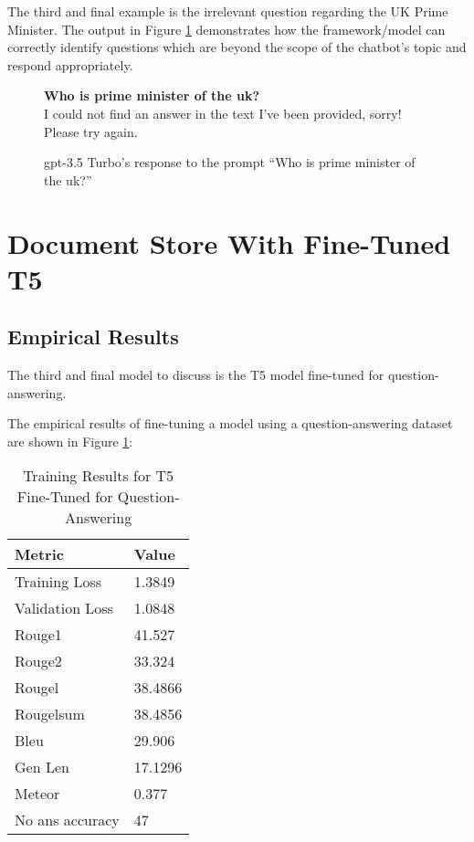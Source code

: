The third and final example is the irrelevant question regarding the UK Prime Minister. The output in Figure \ref{fig:results_gpt_ex3} demonstrates how the framework/model can correctly identify questions which are beyond the scope of the chatbot's topic and respond appropriately.

\begin{figure}[h]
    \begin{itquote}
        \textbf{Who is prime minister of the uk?} \\
        I could not find an answer in the text I've been provided, sorry! Please try again.
    \end{itquote}
    \caption{\acrshort{gpt}-3.5 Turbo's response to the prompt ``Who is prime minister of the uk?''}
    \label{fig:results_gpt_ex3}
\end{figure}

\section{Document Store With Fine-Tuned T5}\label{sec:results_t5}
\subsection{Empirical Results}
The third and final model to discuss is the T5 model fine-tuned for question-answering.



The empirical results of fine-tuning a model using a question-answering dataset are shown in Figure \ref{tab:results_t5}:

\begin{table}[h]
    \centering
    \begin{tabular}{l|l}
        \textbf{Metric} & \textbf{Value} \\ \hline
        Training Loss & 1.3849 \\ \hline
        Validation Loss & 1.0848 \\ \hline
        Rouge1 & 41.527 \\ \hline
        Rouge2 & 33.324 \\ \hline
        Rougel & 38.4866 \\ \hline
        Rougelsum & 38.4856 \\ \hline
        Bleu & 29.906 \\ \hline
        Gen Len & 17.1296 \\ \hline
        Meteor & 0.377 \\ \hline
        No ans accuracy & 47 \\
    \end{tabular}
    \caption{Training Results for T5 Fine-Tuned for Question-Answering}
    \label{tab:results_t5}
\end{table}

